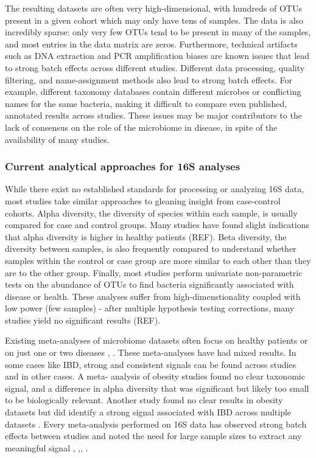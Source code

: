 \documentclass[12pt]{article}
\begin{document}
The resulting datasets are often very high-dimensional, with hundreds 
of OTUs present in a given cohort which may only have tens of samples. 
The data is also incredibly sparse: only very few OTUs tend to be 
present in many of the samples, and most entries in the data matrix 
are zeros. Furthermore, technical artifacts such as DNA extraction and 
PCR amplification biases are known issues that lead to strong batch 
effects across different studies. Different data processing, quality 
filtering, and name-assignment methods also lead to strong batch 
effects. For example, different taxonomy databases contain different 
microbes or conflicting names for the same bacteria, making it 
difficult to compare even published, annotated results across studies.  
These issues may be major contributors to the lack of consensus on the 
role of the microbiome in disease, in spite of the availability of 
many studies.

\subsubsection{Current analytical approaches for 16S analyses}
While there exist no established standards for processing or analyzing 
16S data, most studies take similar approaches to gleaning insight 
from case-control cohorts. Alpha diversity, the diversity of species 
within each sample, is usually compared for case and control groups. 
Many studies have found slight indications that alpha diversity is 
higher in healthy patients (REF). Beta diversity, the diversity 
between samples, is also frequently compared to understand whether 
samples within the control or case group are more similar to each 
other than they are to the other group. Finally, most studies perform 
univariate non-parametric tests on the abundance of OTUs to find 
bacteria significantly associated with disease or health. These 
analyses suffer from high-dimenstionality coupled with low power (few 
samples) - after multiple hypothesis testing corrections, many studies 
yield no significant results (REF).

Existing meta-analyses of microbiome datasets often focus on healthy 
patients or on just one or two diseases \cite{walters-ob_meta-2014}, \cite{sze-signal-2016}. These meta-analyses 
have had mixed results. In some cases like IBD, strong and consistent 
signals can be found across studies and in other cases. A meta-
analysis of obesity studies found no clear taxonomic signal, and a 
difference in alpha diversity that was significant but likely too 
small to be biologically relevant\cite{sze-signal-2016}. Another study 
found no clear results in obesity datasets but did identify a strong 
signal associated with IBD across multiple datasets \cite{walters-ob_meta-2014}. 
Every meta-analysis performed on 16S data has observed 
strong batch effects between studies and noted the need for large 
sample sizes to extract any meaningful signal \cite{sze-signal-2016},
\cite{walters-ob_meta-2014},\cite{knights-supervised-2010},
\cite{lozupone-meta-2013}. 
\end{document}
